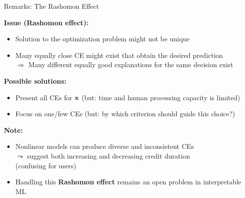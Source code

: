 \documentclass[10pt,compress,t,notes=noshow, xcolor=table]{beamer}
\begin{document}
\begin{frame}{Remarks: The Rashomon Effect}

\textbf{Issue (\textbf{Rashomon effect}):}
\begin{itemize}
    \item Solution to the optimization problem might not be unique
    \item Many equally close CE might exist that obtain the desired prediction\\
    $\Rightarrow$ Many different equally good explanations for the same decision exist
\end{itemize}

\lz\pause

\textbf{Possible solutions:}
	\begin{itemize}
	\item Present all CEs for $\mathbf{x}$ (but: time and human processing capacity is limited)
		\item Focus on one/few CEs (but: by which criterion should guide this choice?)
	\end{itemize}
	
\lz\pause

\textbf{Note:}
	\begin{itemize}
      \item Nonlinear models can produce diverse and inconsistent CEs\\
  $\leadsto$ suggest both increasing and decreasing credit duration\\ (confusing for users)
  \item Handling this \textbf{Rashomon effect} remains an open problem in interpretable ML
	\end{itemize}
\end{frame}
\end{document}
